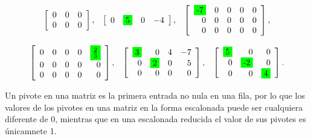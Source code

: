 \documentclass{article}
\begin{document}
\begin{equation*}
    \begin{array}{lrl}
        {\left[\begin{array}{rrr}
            0 & 0 & 0 \\
            0 & 0 & 0
            \end{array}\right],} 
            & {\left[\begin{array}{llll}
            0 & \colorbox{green}{5} & 0 & -4
            \end{array}\right],} 
            & {\left[\begin{array}{rrrrr}
            \colorbox{green}{-7} & 0 & 0 & 0 & 0 \\
            0 & 0 & 0 & 0 & 0 \\
            0 & 0 & 0 & 0 & 0
            \end{array}\right],} 
    \end{array}
\end{equation*}

\begin{equation*}
    \begin{array}{lrl}
        {\left[\begin{array}{rrrrr}
            0 & 0 & 0 & 0 & \colorbox{green}{$\frac{2}{3}$} \\
            0 & 0 & 0 & 0 & 0 \\
            0 & 0 & 0 & 0 & 0
            \end{array}\right],} 
            & {\left[\begin{array}{rrrr}
            \colorbox{green}{3} & 0 & 4 & -7 \\
            0 & \colorbox{green}{2} & 0 & 5 \\
            0 & 0 & 0 & 0
            \end{array}\right],} 
            & {\left[\begin{array}{rrr}
            \colorbox{green}{5} & 0 & 0 \\
            0 & \colorbox{green}{-2} & 0 \\
            0 & 0 & \colorbox{green}{4}
            \end{array}\right] .}
    \end{array}
\end{equation*}

\begin{tcolorbox}[colback=green!20!white,colframe=green!80!black,title=Pivote]
    Un pivote en una matriz es la primera entrada no nula en una fila, por lo que los valores de los pivotes en una matriz en la forma escalonada puede ser cualquiera diferente de 0, mientras que en una escalonada reducida el valor de sus pivotes es únicamnete 1.
\end{tcolorbox}
\end{document}
